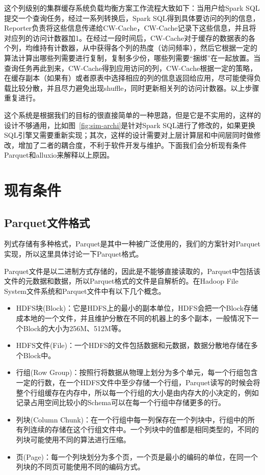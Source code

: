 \par 这个列级别的集群缓存系统负载均衡方案工作流程大致如下：当用户给Spark SQL提交一个查询任务，经过一系列转换后，Spark SQL得到具体要访问的列的信息，Reporter负责将这些信息传递给CW-Cache，CW-Cache记录下这些信息，并且将对应列的访问计数器加1。在经过一段时间后，CW-Cache对于缓存的数据表的各个列，均维持有计数器，从中获得各个列的热度（访问频率），然后它根据一定的算法计算出哪些列需要进行复制，复制多少份，哪些列需要“捆绑”在一起放置。当查询任务再此到来，CW-Cache得到应用访问的列，CW-Cache根据一定的策略，在缓存副本（如果有）或者原表中选择相应的列的信息返回给应用，尽可能使得负载比较分散，并且尽力避免出现shuffle，同时更新相关列的访问计数器。以上步骤重复进行。

\par 这个系统是根据我们的目标的很直接简单的一种思路，但是它是不实用的，这样的设计不够通用，比如图~\ref{fig:sim-archi}是针对Spark SQL进行了修改的，如果更换SQL引擎又需要重新实现；其次，这样的设计需要对上层计算层和中间层同时做修改，增加了二者的耦合度，不利于软件开发与维护。下面我们会分析现有条件Parquet和alluxio来解释以上原因。

\section{现有条件}

\subsection{Parquet文件格式}

\par 列式存储有多种格式，Parquet是其中一种被广泛使用的，我们的方案针对Parquet实现，所以这里具体讨论一下Parquet格式。

\par Parquet文件是以二进制方式存储的，因此是不能够直接读取的，Parquet中包括该文件的元数据和数据，所以Parquet格式的文件是自解析的。在Hadoop File System文件系统和Parquet文件中有以下几个概念。

\begin{itemize}
    \item HDFS块(Block)：它是HDFS上的最小的副本单位，HDFS会把一个Block存储成本地的一个文件，并且维护分散在不同的机器上的多个副本，一般情况下一个Block的大小为256M、512M等。
    \item HDFS文件(File)：一个HDFS的文件包括数据和元数据，数据分散地存储在多个Block中。
    \item 行组(Row Group)：按照行将数据从物理上划分为多个单元，每一个行组包含一定的行数，在一个HDFS文件中至少存储一个行组，Parquet读写的时候会将整个行组缓存在内存中，所以每一个行组的大小是由内存大的小决定的，例如记录占用空间比较小的Schema可以在每一个行组中存储更多的行。
    \item 列块(Column Chunk)：在一个行组中每一列保存在一个列块中，行组中的所有列连续的存储在这个行组文件中。一个列块中的值都是相同类型的，不同的列块可能使用不同的算法进行压缩。
    \item 页(Page)：每一个列块划分为多个页，一个页是最小的编码的单位，在同一个列块的不同页可能使用不同的编码方式。
\end{itemize}


